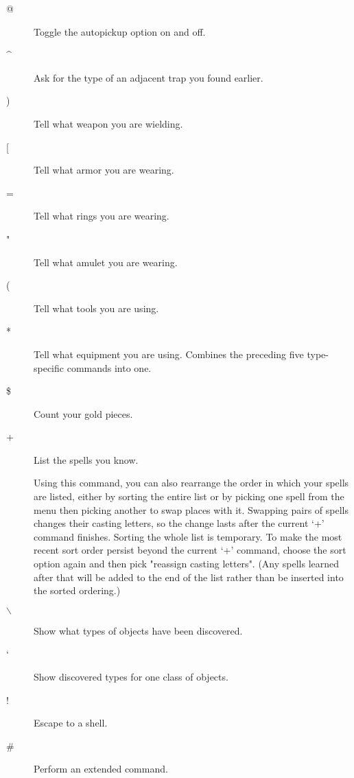 \documentclass[11pt]{article}
\begin{document}
\begin{description}
\item[{@}] Toggle the autopickup option on and off.

\item[{\^{}}] Ask for the type of an adjacent trap you found earlier.

\item[{)}] Tell what weapon you are wielding.

\item[{[}] Tell what armor you are wearing.

\item[{=}] Tell what rings you are wearing.

\item[{"}] Tell what amulet you are wearing.

\item[{(}] Tell what tools you are using.

\item[{*}] Tell what equipment you are using. Combines the preceding five
type-specific commands into one.

\item[{\$}] Count your gold pieces.

\item[{+}] List the spells you know.

Using this command, you can also rearrange the order in which
 your spells are listed, either by sorting the entire list or by
 picking one spell from the menu then picking another to swap places
 with it.  Swapping pairs of spells changes their casting letters, so
 the change lasts after the current `+' command finishes. Sorting the
 whole list is temporary.  To make the most recent sort order persist
 beyond the current `+' command, choose the sort option again and
 then pick "reassign casting letters".  (Any spells learned after
 that will be added to the end of the list rather than be inserted
 into the sorted ordering.)

\item[{$\backslash$}] Show what types of objects have been discovered.

\item[{`}] Show discovered types for one class of objects.

\item[{!}] Escape to a shell.

\item[{\#}] Perform an extended command.
\end{description}
\end{document}
